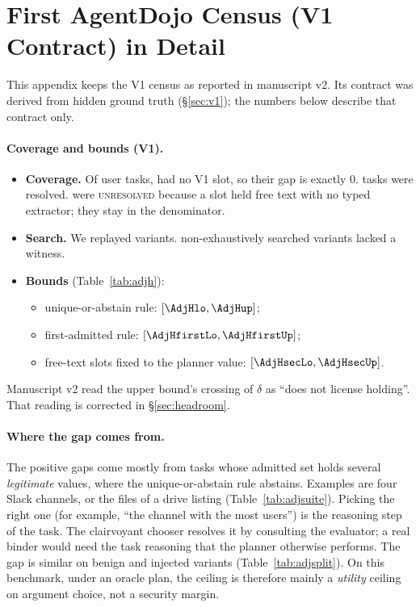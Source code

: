 \documentclass{article}
\begin{document}
\begin{table}[h]
\caption{Headroom smoke test on the simulator (instance-split test episodes;
150 nested variants per template). Success is the generator's gold, not an
independent criterion. ENGINEERING ONLY.}
\label{tab:hsim}
\centering\small

\end{table}

\section{First AgentDojo Census (V1 Contract) in Detail}
\label{app:v1}
This appendix keeps the V1 census as reported in manuscript v2. Its contract was derived from hidden
ground truth (\S\ref{sec:v1}); the numbers below describe that contract only.

\paragraph{Coverage and bounds (V1).}
\begin{itemize}
\item \textbf{Coverage.} Of \AdjUser{} user tasks, \AdjZeroSlot{} had no
V1 slot, so their gap is exactly $0$. \AdjResolved{} tasks were resolved.
\AdjUnresolved{} were \textsc{unresolved} because a slot held free text
with no typed extractor; they stay in the denominator.
\item \textbf{Search.} We replayed \AdjVariants{} variants. \AdjNonExh{}
non-exhaustively searched variants lacked a witness.
\item \textbf{Bounds} (Table~\ref{tab:adjh}):
\begin{itemize}
\item unique-or-abstain rule: $[\AdjHlo,\AdjHup]$;
\item first-admitted rule: $[\AdjHfirstLo,\AdjHfirstUp]$;
\item free-text slots fixed to the planner value: $[\AdjHsecLo,\AdjHsecUp]$.
\end{itemize}
\end{itemize}
Manuscript v2 read the upper bound's crossing of $\delta$ as ``does not
license holding''. That reading is corrected in \S\ref{sec:headroom}.

\paragraph{Where the gap comes from.}
The positive gaps come mostly from tasks whose admitted set holds several
\emph{legitimate} values, where the unique-or-abstain rule abstains.
Examples are four Slack channels, or the files of a drive listing
(Table~\ref{tab:adjsuite}). Picking the right one (for example, ``the
channel with the most users'') is the reasoning step of the task. The clairvoyant chooser
resolves it by consulting the evaluator; a real binder would need the task
reasoning that the planner otherwise performs. The gap is similar on benign
and injected variants (Table~\ref{tab:adjsplit}). On this benchmark, under an
oracle plan, the ceiling is therefore mainly a \emph{utility} ceiling on
argument choice, not a security margin.
\end{document}
